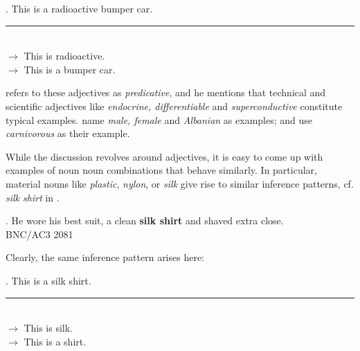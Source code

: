 \ex. \label{ex:radioactive-bumpercar-2} This is a radioactive bumper
car.\vspace{-0.2cm}\\
\rule{5.2cm}{.3mm}\\
$\rightarrow$ This is radioactive.\\
$\rightarrow$ This is a bumper car.

\citet[124]{Kamp:1975} refers to these adjectives as \emph{predicative}, and he
mentions that technical and scientific adjectives like \emph{endocrine,
  differentiable} and \emph{superconductive} constitute typical
examples. 
\citet[124]{KeenanandFaltz:1985} name \emph{male, female} and
\emph{Albanian} as examples; 
\citet{KampandPartee:1995} and \citet{Partee:1995} use
\emph{carnivorous} as their example.




While the discussion revolves around adjectives, it is easy to come up
with examples of noun noun combinations that behave similarly. In
particular, material nouns like \emph{plastic}, \emph{nylon}, or
\emph{silk} give rise to similar inference patterns, cf.
\emph{silk shirt} in \Next. 

\ex. 
He wore his best suit, a clean \textbf{silk shirt} and shaved
extra close.\\
BNC/AC3 2081 	

Clearly, the same inference pattern arises here:

\ex. \label{ex:silk-shirt} This is a silk shirt.\vspace{-0.2cm}\\
\rule{3cm}{.3mm}\\
$\rightarrow$ This is silk.\\
$\rightarrow$ This is a shirt.

